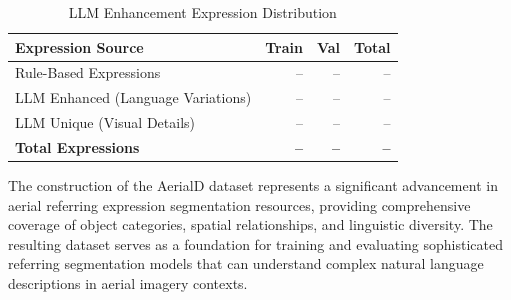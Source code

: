 \begin{table}[H]
\centering
\caption{LLM Enhancement Expression Distribution}
\label{tab:llm_enhancement_stats}
\begin{tabular}{@{}lrrr@{}}
\toprule
\textbf{Expression Source} & \textbf{Train} & \textbf{Val} & \textbf{Total} \\
\midrule
Rule-Based Expressions & -- & -- & -- \\
LLM Enhanced (Language Variations) & -- & -- & -- \\
LLM Unique (Visual Details) & -- & -- & -- \\
\midrule
\textbf{Total Expressions} & \textbf{--} & \textbf{--} & \textbf{--} \\
\bottomrule
\end{tabular}
\end{table}

The construction of the AerialD dataset represents a significant advancement in aerial referring expression segmentation resources, providing comprehensive coverage of object categories, spatial relationships, and linguistic diversity. The resulting dataset serves as a foundation for training and evaluating sophisticated referring segmentation models that can understand complex natural language descriptions in aerial imagery contexts.



